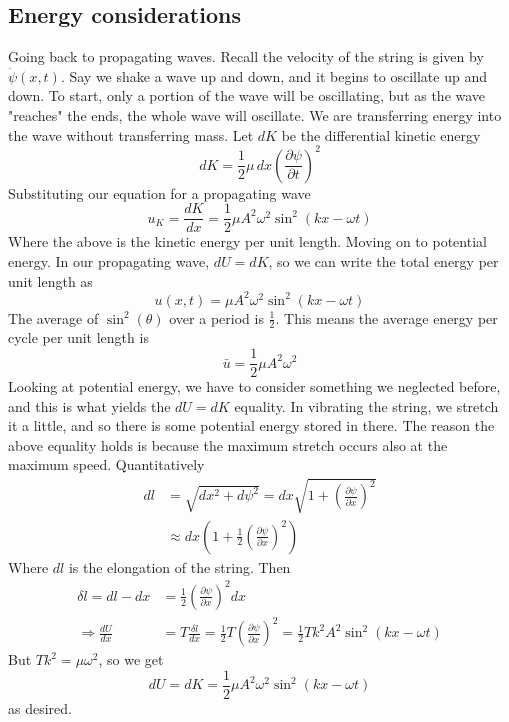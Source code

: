 \documentclass{report}
\numberwithin{equation}{section}
\begin{document}
\subsection{Energy considerations}
Going back to propagating waves. Recall the velocity of the string is given by $\dot{\psi}(x,t)$. Say we shake a wave up and down, and it begins to oscillate up and down. To start, only a portion of the wave will be oscillating, but as the wave "reaches" the ends, the whole wave will oscillate. We are transferring energy into the wave without transferring mass. Let $dK$ be the differential kinetic energy
\begin{equation}
	dK = \frac{1}{2}\mu \,dx\left(\frac{\partial \psi}{\partial t}\right)^2
\end{equation}
Substituting our equation for a propagating wave
\begin{equation}
	u_K = \frac{dK}{dx} = \frac{1}{2}\mu A^2\omega^2\sin^2(kx-\omega t)
\end{equation}
Where the above is the kinetic energy per unit length. Moving on to potential energy. In our propagating wave, $dU = dK$, so we can write the total energy per unit length as
\begin{equation}
	u(x,t) = \mu A^2\omega^2\sin^2(kx-\omega t)
\end{equation}
The average of $\sin^2(\theta)$ over a period is $\frac{1}{2}$. This means the average energy per cycle per unit length is
\begin{equation}
	\bar{u} = \frac{1}{2}\mu A^2\omega^2
\end{equation}
Looking at potential energy, we have to consider something we neglected before, and this is what yields the $dU=dK$ equality. In vibrating the string, we stretch it a little, and so there is some potential energy stored in there. The reason the above equality holds is because the maximum stretch occurs also at the maximum speed. Quantitatively
\begin{align}
	dl &= \sqrt{dx^2 + d\psi^2} = dx\sqrt{1+\left(\frac{\partial\psi}{\partial x}\right)^2}\\
	&\approx dx\left(1+\frac{1}{2}\left(\frac{\partial \psi}{\partial x}\right)^2\right)
\end{align}
Where $dl$ is the elongation of the string. Then
\begin{align}
	\delta l = dl - dx &= \frac{1}{2}\left(\frac{\partial \psi}{\partial x}\right)^2 dx\\
	\Rightarrow \frac{dU}{dx} &= T\frac{\delta l}{dx} = \frac{1}{2}T\left(\frac{\partial \psi}{\partial x}\right)^2 = \frac{1}{2}Tk^2A^2\sin^2(kx-\omega t)
\end{align}
But $Tk^2 = \mu \omega^2$, so we get
\begin{equation}
dU = dK = \frac{1}{2}\mu A^2\omega^2\sin^2(kx-\omega t)
\end{equation}
as desired.
\end{document}
